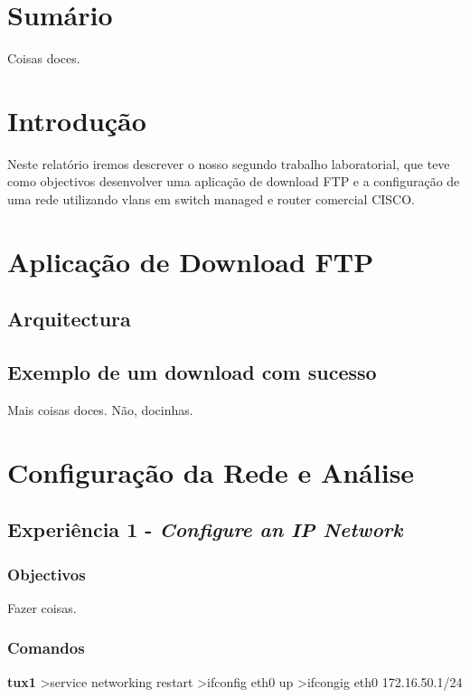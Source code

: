 \documentclass[a4paper,11pt]{article}
\begin{document}

\newpage
\section{Sumário}
Coisas doces.

\section{Introdução}
Neste relatório iremos descrever o nosso segundo trabalho laboratorial, que teve como objectivos desenvolver uma aplicação de download FTP e a configuração de uma rede utilizando vlans em switch managed e router comercial CISCO.

\section{Aplicação de Download FTP}
\subsection{Arquitectura}

\subsection{Exemplo de um download com sucesso}
Mais coisas doces. Não, docinhas.

\section{Configuração da Rede e Análise }
\subsection{Experiência 1 - \textit{Configure an IP Network}}
\subsubsection{Objectivos}
Fazer coisas.

\subsubsection{Comandos}
\textbf{tux1}
>service networking restart
>ifconfig eth0 up
>ifcongig eth0 172.16.50.1/24
\end{document}
